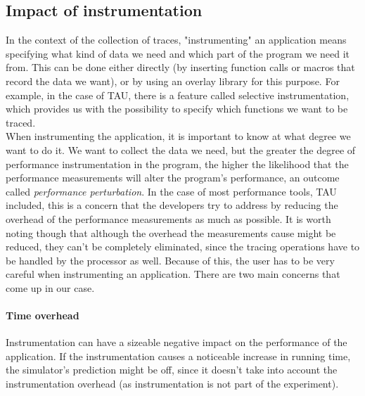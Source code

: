 \subsection{Impact of instrumentation}
In the context of the collection of traces, "instrumenting" an
application means specifying what kind of data we need and which
part of the program we need it from. This can be done either directly
(by inserting function calls or macros that record the data we want),
or by using an overlay library for this purpose. For example, in the
case of TAU, there is a feature called selective instrumentation,
which provides us with the possibility to specify which functions we
want to be traced.\\
When instrumenting the application, it is important to know at what
degree we want to do it. We want to collect the data we need, but the
greater the degree of performance instrumentation in the program, the
higher the likelihood that the performance measurements will alter the
program's performance, an outcome called \emph{performance
 perturbation}.\cite{sm06} In the case of most performance tools, TAU
included, this is a concern that the developers try to address by
reducing the overhead of the performance measurements as much as
possible. It is worth noting though that although the overhead the
measurements cause might be reduced, they can't be completely
eliminated, since the tracing operations have to
be handled by the processor as well. Because of this, the user has to be
very careful when instrumenting an application. There are two main
concerns that come up in our case.
\paragraph{Time overhead}
Instrumentation can have a sizeable negative impact on the performance
of the application. If the instrumentation causes a noticeable
increase in running time, the simulator's prediction might be off,
since it doesn't take into account the instrumentation overhead (as
instrumentation is not part of the experiment).
